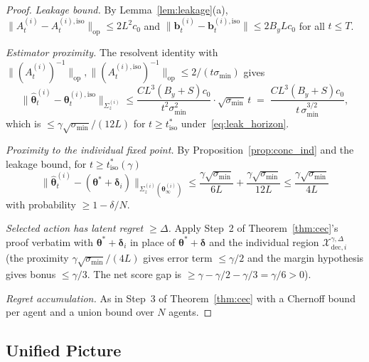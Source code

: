 \documentclass[11pt]{article}
\begin{document}
\begin{proof}
\textit{Leakage bound.}
By Lemma~\ref{lem:leakage}(a),
$\|A_t^{(i)}-A_t^{(i),\mathrm{iso}}\|_{\mathrm{op}}\leq 2L^2 c_0$ and
$\|\bm{b}_t^{(i)}-\bm{b}_t^{(i),\mathrm{iso}}\|\leq 2B_y L c_0$ for all
$t\leq T$.

\textit{Estimator proximity.}
The resolvent identity with
$\|(A_t^{(i)})^{-1}\|_{\mathrm{op}},
\|(A_t^{(i),\mathrm{iso}})^{-1}\|_{\mathrm{op}}\leq 2/(t\sigma_{\min})$
gives
\[
\|\widehat{\bm{\theta}}_t^{(i)}-\bm{\theta}_t^{(i),\mathrm{iso}}\|_{\Sigma_z^{(i)}}
\leq\frac{CL^3(B_y+S)c_0}{t^2\sigma_{\min}^{2}}\cdot\sqrt{\sigma_{\min}}\,t
\;=\;\frac{CL^3(B_y+S)c_0}{t\,\sigma_{\min}^{3/2}},
\]
which is $\leq\gamma\sqrt{\sigma_{\min}}/(12L)$ for
$t\geq t_{\mathrm{iso}}^*$ under~\eqref{eq:leak_horizon}.

\textit{Proximity to the individual fixed point.}
By Proposition~\ref{prop:conc_ind} and the leakage bound,
for $t\geq t_{\mathrm{iso}}^*(\gamma)$ \[
\|\widehat{\bm{\theta}}_t^{(i)}-(\bm{\theta}^{\!*}+\bm{\delta}_i)\|_{\Sigma_z^{(i)}(\bm{\theta}_\infty^{(i)})}
\leq\frac{\gamma\sqrt{\sigma_{\min}}}{6L}
+\frac{\gamma\sqrt{\sigma_{\min}}}{12L}
\leq\frac{\gamma\sqrt{\sigma_{\min}}}{4L}
\]
with probability $\geq 1-\delta/N$.

\textit{Selected action has latent regret $\geq\Delta$.}
Apply Step~2 of Theorem~\ref{thm:cec}'s proof verbatim with
$\bm{\theta}^{\!*}+\bm{\delta}_i$ in place of
$\bm{\theta}^{\!*}+\bm{\delta}$ and the individual region
$\mathcal{X}_{\mathrm{dec},i}^{\gamma,\Delta}$ (the proximity
$\gamma\sqrt{\sigma_{\min}}/(4L)$ gives error term $\leq\gamma/2$ and
the margin hypothesis gives bonus $\leq\gamma/3$. The net score gap is
$\geq\gamma-\gamma/2-\gamma/3=\gamma/6>0$).

\textit{Regret accumulation.}
As in Step~3 of Theorem~\ref{thm:cec} with a Chernoff bound per agent
and a union bound over $N$ agents.
\end{proof}

\subsection{Unified Picture}
\end{document}
